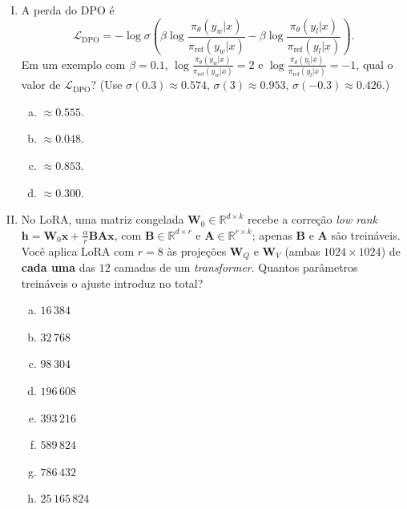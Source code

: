 \documentclass{dlproblemset}
\begin{document}
\begin{enumerate}[I)]
\item {} A perda do DPO é
      \[
        \mathcal{L}_{\text{DPO}} = -\log\sigma\!\left(
          \beta\log\frac{\pi_\theta(y_w|x)}{\pi_{\text{ref}}(y_w|x)}
          - \beta\log\frac{\pi_\theta(y_l|x)}{\pi_{\text{ref}}(y_l|x)}
        \right).
      \]
      Em um exemplo com $\beta = 0.1$,
      $\log\tfrac{\pi_\theta(y_w|x)}{\pi_{\text{ref}}(y_w|x)} = 2$ e
      $\log\tfrac{\pi_\theta(y_l|x)}{\pi_{\text{ref}}(y_l|x)} = -1$, qual o
      valor de $\mathcal{L}_{\text{DPO}}$?
      (Use $\sigma(0.3) \approx 0.574$, $\sigma(3) \approx 0.953$,
      $\sigma(-0.3) \approx 0.426$.)

\begin{enumerate}[a)]
    \item $\approx 0.555$.
    \item $\approx 0.048$.
    \item $\approx 0.853$.
    \item $\approx 0.300$.
\end{enumerate}

\item No LoRA, uma matriz congelada $\mathbf{W}_0 \in \mathbb{R}^{d \times k}$ recebe a correção \textit{low rank} $\mathbf{h} = \mathbf{W}_0 \mathbf{x} + \frac{\alpha}{r} \mathbf{B} \mathbf{A} \mathbf{x}$, com $\mathbf{B} \in \mathbb{R}^{d \times r}$ e $\mathbf{A} \in \mathbb{R}^{r \times k}$; apenas $\mathbf{B}$ e $\mathbf{A}$ são treináveis. Você aplica LoRA com $r = 8$ às projeções $\mathbf{W}_Q$ e $\mathbf{W}_V$ (ambas $1024 \times 1024$) de \textbf{cada uma} das $12$ camadas de um \textit{transformer}. Quantos parâmetros treináveis o ajuste introduz no total?

\begin{enumerate}[a)]
    \item $16\,384$
    \item $32\,768$
    \item $98\,304$
    \item $196\,608$
    \item $393\,216$
    \item $589\,824$
    \item $786\,432$
    \item $25\,165\,824$
\end{enumerate}


\end{enumerate}
\end{document}
